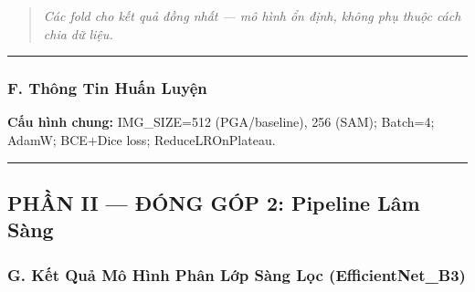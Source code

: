 \begin{quote}\itshape Các fold cho kết quả đồng nhất — mô hình ổn định, không phụ thuộc cách chia dữ liệu.\end{quote}

\vspace{0.5em}\hrule\vspace{0.5em}


\subsubsection{F. Thông Tin Huấn Luyện}

\begin{table}[htbp]
\centering\renewcommand{\arraystretch}{1.2}
\end{table}

\textbf{Cấu hình chung:} IMG\_SIZE=512 (PGA/baseline), 256 (SAM); Batch=4; AdamW; BCE+Dice loss; ReduceLROnPlateau.

\vspace{0.5em}\hrule\vspace{0.5em}


\subsection{PHẦN II — ĐÓNG GÓP 2: Pipeline Lâm Sàng}


\subsubsection{G. Kết Quả Mô Hình Phân Lớp Sàng Lọc (EfficientNet\_B3)}

